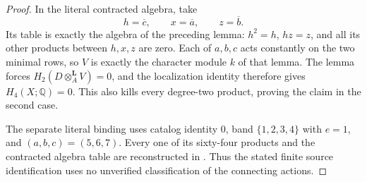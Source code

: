 \begin{proof}
In the literal contracted algebra, take
\[
 h=\overline c,\qquad x=\overline a,\qquad z=\overline b.
\]
Its table is exactly the algebra of the preceding lemma:
$h^2=h$, $hz=z$, and all its other products between
$h,x,z$ are zero.  Each of $a,b,c$ acts constantly on the two
minimal rows, so $V$ is exactly the character module $k$ of
that lemma.  The lemma forces
$H_2(D\otimes_A^{\mathbf L}V)=0$, and the localization identity
therefore gives $H_4(X;\mathbb Q)=0$.  This also kills every
degree-two product, proving the claim in the second case.

The separate literal binding uses catalog identity $0$, band
$\{1,2,3,4\}$ with $e=1$, and $(a,b,c)=(5,6,7)$.  Every
one of its sixty-four products and the contracted algebra table
are reconstructed in
.
Thus the stated finite source identification uses no unverified
classification of the connecting actions.
\end{proof}
